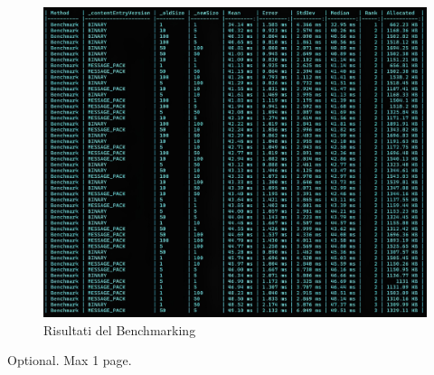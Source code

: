 \documentclass[12pt,a4paper,openright,twoside]{book}
\begin{document}
            \begin{figure}
                \centering
                \includegraphics[width=1\linewidth]{figures/BenchmarkS-D.jpeg}
                \caption{Risultati del Benchmarking}
                \label{fig:serialization}
            \end{figure}

        












\backmatter

\nocite{*} %




\begin{acknowledgements} %
Optional. Max 1 page.
\end{acknowledgements}
\end{document}
